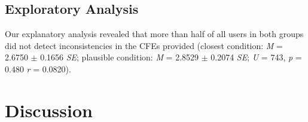 \subsection{Exploratory Analysis}
Our explanatory analysis revealed that more than half of all users in both groups did not detect inconsistencies in the \glspl{CFE} provided (closest condition: \textit{M} = 2.6750 $\pm$ 0.1656 \textit{SE}; plausible condition: \textit{M} = 2.8529 $\pm$ 0.2074 \textit{SE}; \textit{U} = 743, \textit{p} = 0.480 \textit{r} = 0.0820).

\section{Discussion}\label{sec:discussion}


